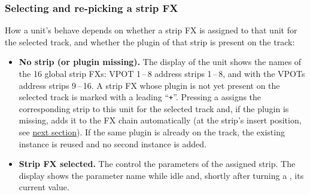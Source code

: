 

\subsubsection{Selecting and re-picking a strip FX}\label{stripselect}

How a unit's \vpots behave depends on whether a strip FX is assigned to that
unit for the selected track, and whether the plugin of that strip is present
on the track:

\begin{itemize}
\item \textbf{No strip (or plugin missing).} The display of the unit shows
  the names of the 16 global strip FXs: VPOT 1\,--\,8 address strips
  1\,--\,8, and with \shift the VPOTs address strips 9\,--\,16. A strip FX whose
  plugin is not yet present on the selected track is marked with a leading
  ``\verb|+|''. Pressing a \vpot assigns the corresponding strip to this unit
  for the selected track and, if the plugin is missing, adds it to the
  FX chain automatically (at the strip's insert position, see
  \hyperref[channelstripeditor]{next section}). If the same plugin is already
  on the track, the existing instance is reused and no second instance is
  added.
\item \textbf{Strip FX selected.} The \vpots control the parameters
  of the assigned strip. The display shows the parameter name while idle and,
  shortly after turning a \vpot, its current value.
\end{itemize}

